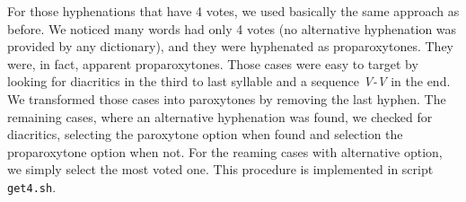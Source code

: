\documentclass{article}
\begin{document}


For those hyphenations that have 4 votes, we used basically the same approach
as before. We noticed many words had only 4 votes (no alternative hyphenation was provided
by any dictionary), and they were hyphenated as proparoxytones. They were, in fact, 
apparent proparoxytones. Those cases were easy to target by looking
for diacritics in the third to last syllable and a sequence \emph{V-V} in the end.
We transformed those cases into paroxytones by removing the last hyphen.
The remaining cases, where an alternative hyphenation was found, we checked for
diacritics, selecting the paroxytone option when found and selection the
proparoxytone option when not. For the reaming cases with alternative option,
we simply select the most voted one. This procedure is implemented in script 
\texttt{get4.sh}.



\end{document}
